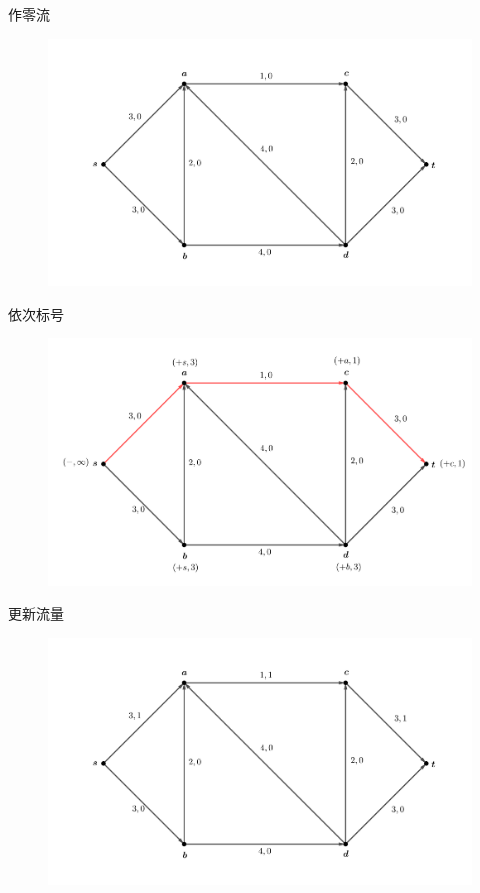 \documentclass[lang = cn, scheme = chinese, thmcnt = section]{elegantbook}
\begin{document}
\begin{solution}
	作零流
	\begin{figure}[H]
		\centering
		\includegraphics[scale = 0.15]{../图/13.2.2}
	\end{figure}
	
	依次标号
	\begin{figure}[H]
		\centering
		\includegraphics[scale = 0.15]{../图/13.2.3}
	\end{figure}
	更新流量
	\begin{figure}[H]
		\centering
		\includegraphics[scale = 0.15]{../图/13.2.4}
	\end{figure}
	

\end{solution}
\end{document}

